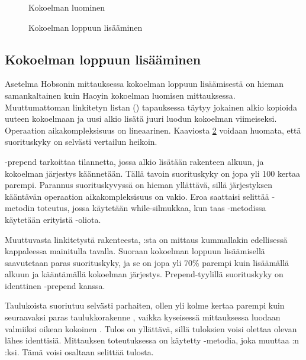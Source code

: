 \begin{figure}[h]
    \centering
    
    \caption{Kokoelman luominen}\label{kokoelmanLuominen_kaavio}
\end{figure}


\begin{figure}[h]
    \centering
    
    \caption{Kokoelman loppuun lisääminen}\label{kokoelmanLoppuunLisaaminen_kaavio}
\end{figure}

\subsection{Kokoelman loppuun lisääminen}
Asetelma Hobsonin mittauksessa\cite{hobsonBenchmark} kokoelman loppuun lisäämisestä on hieman samankaltainen kuin Haoyin\cite{haoyiBenchmark} kokoelman luomisen mittauksessa. Muuttumattoman linkitetyn listan () tapauksessa täytyy jokainen alkio kopioida uuteen kokoelmaan ja uusi alkio lisätä juuri luodun kokoelman viimeiseksi. Operaation aikakompleksisuus on lineaarinen. Kaaviosta \ref{kokoelmanLoppuunLisaaminen_kaavio} voidaan huomata, että suorituskyky on selvästi vertailun heikoin.

-prepend tarkoittaa tilannetta, jossa alkio lisätään rakenteen alkuun, ja kokoelman järjestys käännetään. Tällä tavoin suorituskyky on jopa yli 100 kertaa parempi. Parannus suorituskyvyssä on hieman yllättävä, sillä järjestyksen kääntävän operaation aikakompleksisuus on vakio. Eroa saattaisi selittää -metodin toteutus, jossa käytetään while-silmukkaa, kun taas \code{:+}-metodissa käytetään erityistä -oliota.

Muuttuvasta linkitetystä rakenteesta, :sta on mittaus kummallakin edellisessä kappaleessa mainitulla tavalla. Suoraan kokoelman loppuun lisäämisellä saavutetaan paras suorituskyky, ja se on jopa yli 70\% parempi kuin lisäämällä alkuun ja kääntämällä kokoelman järjestys. Prepend-tyylillä suorituskyky on identtinen -prepend kanssa. 

Taulukoista  suoriutuu selvästi parhaiten, ollen yli kolme kertaa parempi kuin seuraavaksi paras taulukkorakenne , vaikka kyseisessä mittauksessa luodaan valmiiksi oikean kokoinen . Tulos on yllättävä, sillä tuloksien voisi olettaa olevan lähes identtisiä. Mittauksen \cite{hobsonBenchmark} toteutuksessa on käytetty -metodia, joka muuttaa :n :ksi. Tämä voisi osaltaan selittää tulosta.

